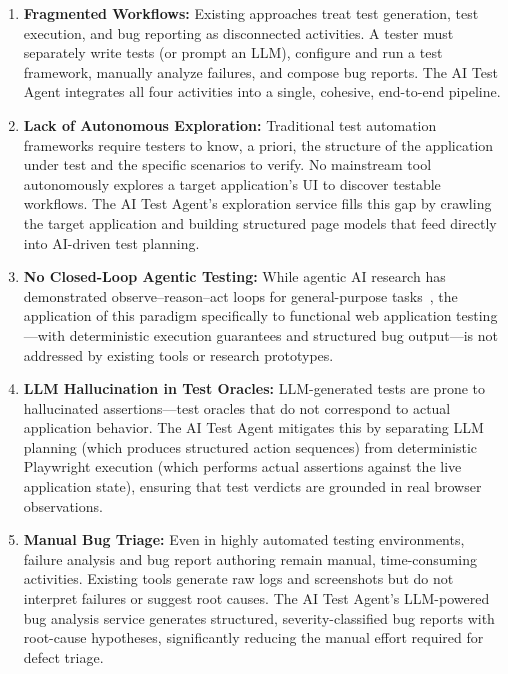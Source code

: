 \begin{enumerate}[nosep]
  \item \textbf{Fragmented Workflows:} Existing approaches treat test
        generation, test execution, and bug reporting as disconnected
        activities. A tester must separately write tests (or prompt an
        LLM), configure and run a test framework, manually analyze
        failures, and compose bug reports. The AI Test Agent integrates
        all four activities into a single, cohesive, end-to-end pipeline.

  \item \textbf{Lack of Autonomous Exploration:} Traditional test
        automation frameworks require testers to know, a priori, the
        structure of the application under test and the specific
        scenarios to verify. No mainstream tool autonomously explores
        a target application's UI to discover testable workflows. The
        AI Test Agent's exploration service fills this gap by crawling
        the target application and building structured page models that
        feed directly into AI-driven test planning.

  \item \textbf{No Closed-Loop Agentic Testing:} While agentic AI
        research has demonstrated observe--reason--act loops for
        general-purpose tasks~\cite{wang2024survey, yang2023agentic},
        the application of this paradigm specifically to functional
        web application testing---with deterministic execution
        guarantees and structured bug output---is not addressed by
        existing tools or research prototypes.

  \item \textbf{LLM Hallucination in Test Oracles:} LLM-generated
        tests are prone to hallucinated assertions---test oracles that
        do not correspond to actual application behavior. The AI Test
        Agent mitigates this by separating LLM planning (which produces
        structured action sequences) from deterministic Playwright
        execution (which performs actual assertions against the live
        application state), ensuring that test verdicts are grounded
        in real browser observations.

  \item \textbf{Manual Bug Triage:} Even in highly automated testing
        environments, failure analysis and bug report authoring remain
        manual, time-consuming activities. Existing tools generate raw
        logs and screenshots but do not interpret failures or suggest
        root causes. The AI Test Agent's LLM-powered bug analysis
        service generates structured, severity-classified bug reports
        with root-cause hypotheses, significantly reducing the manual
        effort required for defect triage.


\end{enumerate}
